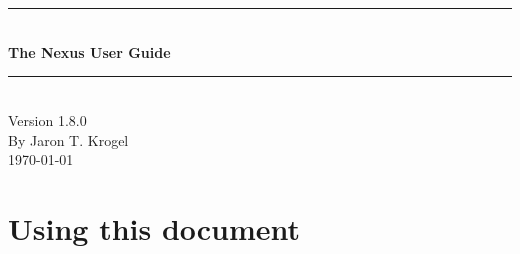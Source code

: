 \documentclass[oneside,11pt]{memoir}
\numberwithin{equation}{section}
\newcommand{\HRule}{\rule{\linewidth}{0.5mm}}
\newenvironment{changemargin}[2]{%
\begin{list}{}{%
\setlength{\leftmargin}{#1}%
\setlength{\rightmargin}{#2}%
}%
\item[]}{\end{list}}
\begin{document}


\thispagestyle{empty}
\begin{changemargin}{-1cm}{-1cm}
  \begin{center}
    \hspace{1cm}\\
    \hspace{1cm}\\
    \hspace{1cm}\\
    \hspace{1cm}\\
    \hspace{1cm}\\
    \hspace{1cm}\\
    \hspace{1cm}\\
    \hspace{1cm}\\
    \hspace{1cm}\\
    \hspace{1cm}\\
    \hspace{1cm}\\
    \hspace{1cm}\\
    \HRule\\
    \vspace{4mm}
    \textbf{\fontsize{40}{45}\selectfont The Nexus User Guide} \\ 
    \HRule\\
    \vspace{1cm}
    \vspace{6cm}
    Version 1.8.0 \\
    \vspace{1 cm}
    By Jaron T. Krogel \\
    \vspace{1cm}
    \today
  \end{center}
\end{changemargin}
\pagebreak

\tableofcontents



\mainmatter

\pagebreak
\chapter{Using this document} \label{usedoc}
\end{document}
